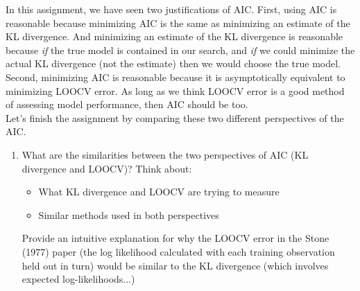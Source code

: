 \documentclass[11pt]{article}
\begin{document}
In this assignment, we have seen two justifications of AIC. First, using AIC is reasonable because minimizing AIC is the same as minimizing an estimate of the KL divergence. And minimizing an estimate of the KL divergence is reasonable because \textit{if} the true model is contained in our search, and \textit{if} we could minimize the actual KL divergence (not the estimate) then we would choose the true model. Second, minimizing AIC is reasonable because it is asymptotically equivalent to minimizing LOOCV error. As long as we think LOOCV error is a good method of assessing model performance, then AIC should be too.\\

\noindent Let's finish the assignment by comparing these two different perspectives of the AIC.

\begin{enumerate}
\item  What are the similarities between the two perspectives of AIC (KL divergence and LOOCV)? Think about:

\begin{itemize}
\item What KL divergence and LOOCV are trying to measure
\item Similar methods used in both perspectives
\end{itemize}

Provide an intuitive explanation for why the LOOCV error in the Stone (1977) paper (the log likelihood calculated with each training observation held out in turn) would be similar to the KL divergence (which involves expected log-likelihoods...)
\end{enumerate}
\end{document}
